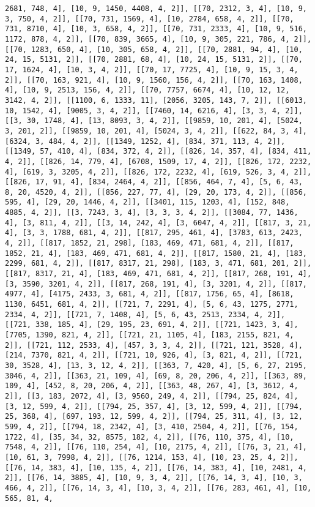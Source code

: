 \documentclass[12pt,fleqn]{article}\usepackage{../../common}
\begin{document}
\begin{verbatim}
2681, 748, 4], [10, 9, 1450, 4408, 4, 2]], [[70, 2312, 3, 4], [10, 9, 3, 750, 4, 2]], [[70, 731, 1569, 4], [10, 2784, 658, 4, 2]], [[70, 731, 8710, 4], [10, 3, 658, 4, 2]], [[70, 731, 2333, 4], [10, 9, 516, 1172, 878, 4, 2]], [[70, 839, 3665, 4], [10, 9, 305, 221, 786, 4, 2]], [[70, 1283, 650, 4], [10, 305, 658, 4, 2]], [[70, 2881, 94, 4], [10, 24, 15, 5131, 2]], [[70, 2881, 68, 4], [10, 24, 15, 5131, 2]], [[70, 17, 1624, 4], [10, 3, 4, 2]], [[70, 17, 7725, 4], [10, 9, 15, 3, 4, 2]], [[70, 163, 921, 4], [10, 9, 1560, 156, 4, 2]], [[70, 163, 1408, 4], [10, 9, 2513, 156, 4, 2]], [[70, 7757, 6674, 4], [10, 12, 12, 3142, 4, 2]], [[1100, 6, 1333, 11], [2056, 3205, 143, 7, 2]], [[6013, 10, 1542, 4], [9005, 3, 4, 2]], [[7460, 14, 6216, 4], [3, 3, 4, 2]], [[3, 30, 1748, 4], [13, 8093, 3, 4, 2]], [[9859, 10, 201, 4], [5024, 3, 201, 2]], [[9859, 10, 201, 4], [5024, 3, 4, 2]], [[622, 84, 3, 4], [6324, 3, 484, 4, 2]], [[1349, 1252, 4], [834, 371, 113, 4, 2]], [[1349, 57, 410, 4], [834, 372, 4, 2]], [[826, 14, 357, 4], [834, 411, 4, 2]], [[826, 14, 779, 4], [6708, 1509, 17, 4, 2]], [[826, 172, 2232, 4], [619, 3, 3205, 4, 2]], [[826, 172, 2232, 4], [619, 526, 3, 4, 2]], [[826, 17, 91, 4], [834, 2464, 4, 2]], [[856, 464, 7, 4], [5, 6, 43, 8, 20, 4520, 4, 2]], [[856, 227, 77, 4], [29, 20, 173, 4, 2]], [[856, 595, 4], [29, 20, 1446, 4, 2]], [[3401, 115, 1203, 4], [152, 848, 4885, 4, 2]], [[3, 7243, 3, 4], [3, 3, 3, 4, 2]], [[3084, 77, 1436, 4], [3, 811, 4, 2]], [[3, 14, 242, 4], [3, 6047, 4, 2]], [[817, 3, 21, 4], [3, 3, 1788, 681, 4, 2]], [[817, 295, 461, 4], [3783, 613, 2423, 4, 2]], [[817, 1852, 21, 298], [183, 469, 471, 681, 4, 2]], [[817, 1852, 21, 4], [183, 469, 471, 681, 4, 2]], [[817, 1580, 21, 4], [183, 2299, 681, 4, 2]], [[817, 8317, 21, 298], [183, 3, 471, 681, 201, 2]], [[817, 8317, 21, 4], [183, 469, 471, 681, 4, 2]], [[817, 268, 191, 4], [3, 3590, 3201, 4, 2]], [[817, 268, 191, 4], [3, 3201, 4, 2]], [[817, 4977, 4], [4175, 2433, 3, 681, 4, 2]], [[817, 1756, 65, 4], [8618, 1130, 6451, 681, 4, 2]], [[721, 7, 2291, 4], [5, 6, 43, 1275, 2771, 2334, 4, 2]], [[721, 7, 1408, 4], [5, 6, 43, 2513, 2334, 4, 2]], [[721, 338, 185, 4], [29, 195, 23, 691, 4, 2]], [[721, 1423, 3, 4], [7705, 1390, 821, 4, 2]], [[721, 21, 1105, 4], [183, 2155, 821, 4, 2]], [[721, 112, 2533, 4], [457, 3, 3, 4, 2]], [[721, 121, 3528, 4], [214, 7370, 821, 4, 2]], [[721, 10, 926, 4], [3, 821, 4, 2]], [[721, 30, 3528, 4], [13, 3, 12, 4, 2]], [[363, 7, 420, 4], [5, 6, 27, 2195, 3046, 4, 2]], [[363, 21, 109, 4], [69, 8, 20, 206, 4, 2]], [[363, 89, 109, 4], [452, 8, 20, 206, 4, 2]], [[363, 48, 267, 4], [3, 3612, 4, 2]], [[3, 183, 2072, 4], [3, 9560, 249, 4, 2]], [[794, 25, 824, 4], [3, 12, 599, 4, 2]], [[794, 25, 357, 4], [3, 12, 599, 4, 2]], [[794, 25, 368, 4], [697, 193, 12, 599, 4, 2]], [[794, 25, 311, 4], [3, 12, 599, 4, 2]], [[794, 18, 2342, 4], [3, 410, 2504, 4, 2]], [[76, 154, 1722, 4], [35, 34, 32, 8575, 182, 4, 2]], [[76, 110, 375, 4], [10, 7548, 4, 2]], [[76, 110, 254, 4], [10, 2175, 4, 2]], [[76, 3, 21, 4], [10, 61, 3, 7998, 4, 2]], [[76, 1214, 153, 4], [10, 23, 25, 4, 2]], [[76, 14, 383, 4], [10, 135, 4, 2]], [[76, 14, 383, 4], [10, 2481, 4, 2]], [[76, 14, 3885, 4], [10, 9, 3, 4, 2]], [[76, 14, 3, 4], [10, 3, 466, 4, 2]], [[76, 14, 3, 4], [10, 3, 4, 2]], [[76, 283, 461, 4], [10, 565, 81, 4, 
\end{verbatim}
\end{document}
